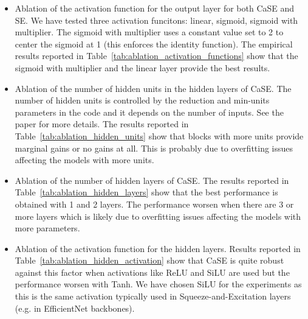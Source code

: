 \documentclass{article}
\begin{document}
\begin{itemize}
    \item Ablation of the activation function for the output layer for both CaSE and SE. We have tested three activation funcitons: linear, sigmoid, sigmoid with multiplier. The sigmoid with multiplier uses a constant value set to 2 to center the sigmoid at 1 (this enforces the identity function). The empirical results reported in Table~\ref{tab:ablation_activation_functions} show that the sigmoid with multiplier and the linear layer provide the best results.
    \item Ablation of the number of hidden units in the hidden layers of CaSE. The number of hidden units is controlled by the reduction and min-units parameters in the code and it depends on the number of inputs. See the paper for more details. The results reported in Table~\ref{tab:ablation_hidden_units} show that blocks with more units provide marginal gains or no gains at all. This is probably due to overfitting issues affecting the models with more units.
    \item Ablation of the number of hidden layers of CaSE. The results reported in Table~\ref{tab:ablation_hidden_layers} show that the best performance is obtained with 1 and 2 layers. The performance worsen when there are 3 or more layers which is likely due to overfitting issues affecting the models with more parameters.
    \item Ablation of the activation function for the hidden layers. Results reported in Table~\ref{tab:ablation_hidden_activation} show that CaSE is quite robust against this factor when activations like ReLU and SiLU are used but the performance worsen with Tanh. We have chosen SiLU for the experiments as this is the same activation typically used in Squeeze-and-Excitation layers (e.g. in EfficientNet backbones).
\end{itemize}
\end{document}
